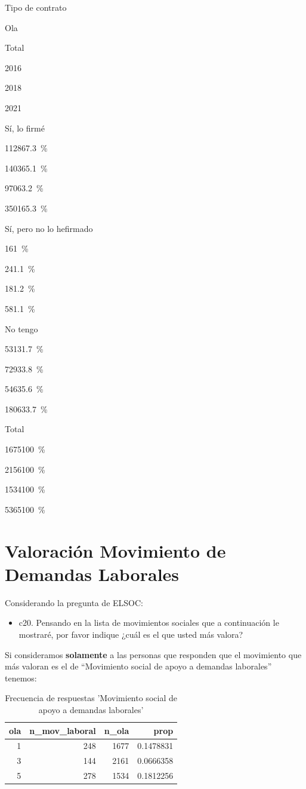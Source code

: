 \documentclass[
  12pt,
]{book}
\providecommand{\tightlist}{%
  \setlength{\itemsep}{0pt}\setlength{\parskip}{0pt}}
\begin{document}
Tipo de contrato

Ola

Total

2016

2018

2021

Sí, lo firmé

{1128}{67.3~\%}

{1403}{65.1~\%}

{970}{63.2~\%}

{3501}{65.3~\%}

Sí, pero no lo hefirmado

{16}{1~\%}

{24}{1.1~\%}

{18}{1.2~\%}

{58}{1.1~\%}

No tengo

{531}{31.7~\%}

{729}{33.8~\%}

{546}{35.6~\%}

{1806}{33.7~\%}

Total

{1675}{100~\%}

{2156}{100~\%}

{1534}{100~\%}

{5365}{100~\%}

\hypertarget{valoraciuxf3n-movimiento-de-demandas-laborales}{%
\section{Valoración Movimiento de Demandas Laborales}\label{valoraciuxf3n-movimiento-de-demandas-laborales}}

Considerando la pregunta de ELSOC:

\begin{itemize}
\tightlist
\item
  c20. Pensando en la lista de movimientos sociales que a continuación le mostraré, por favor indique ¿cuál es el que usted más valora?
\end{itemize}

Si consideramos \textbf{solamente} a las personas que responden que el movimiento que más valoran es el de ``Movimiento social de apoyo a demandas laborales'' tenemos:

\begin{table}

\caption{\label{tab:unnamed-chunk-16}Frecuencia de respuestas 'Movimiento social de apoyo a demandas laborales'}
\centering
\begin{tabular}[t]{r|r|r|r}
\hline
ola & n\_mov\_laboral & n\_ola & prop\\
\hline
1 & 248 & 1677 & 0.1478831\\
\hline
3 & 144 & 2161 & 0.0666358\\
\hline
5 & 278 & 1534 & 0.1812256\\
\hline
\end{tabular}
\end{table}
\end{document}
